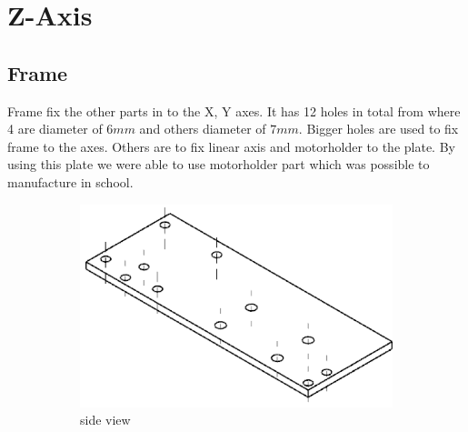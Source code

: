 \documentclass[a4paper,12pt]{scrreprt}
\begin{document}
\section{Z-Axis}


\subsection{Frame}
Frame fix the other parts in to the X, Y axes. It has 12 holes in total from where 4 are diameter of $6mm$ and others diameter of $7mm$. Bigger holes are used to fix frame to the axes. Others are to fix linear axis and motorholder to the plate. By using this plate we were able to use motorholder part which was possible to manufacture in school.

  \begin{figure} [H]
        \centering
        \begin{subfigure}[b]{0.55\textwidth}
                \centering
                \includegraphics[width=1\textwidth]{pictures/frame_1}
                \caption{side view}\label{fig:frame side view}
        \end{subfigure}%
        ~ %
        \begin{subfigure}[b]{0.35\textwidth}
                \centering

\end{subfigure}
\end{figure}
\end{document}
